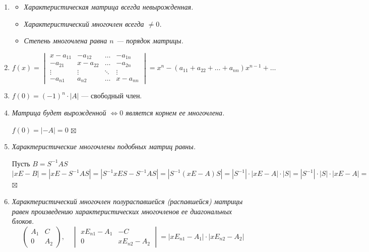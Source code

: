 \documentclass[a4paper, 12pt]{article}
\newenvironment{Proof}
{\par\noindent{$\blacklozenge$}}
{\hfill$\scriptstyle\boxtimes$}
\begin{document}
    \begin{enumerate}
        \item \begin{itemize}
            \item \textit{Характеристическая матрица всегда невырожденная.}
            \item \textit{Характеристический многочлен всегда $\neq 0$.}
            \item \textit{Степень многочлена равна $n$ --- порядок матрицы.}
        \end{itemize}
        \item $f(x) = 
        \begin{vmatrix}
        x-a_{11} & -a_{12} & \dots & -a_{1n}\\
        -a_{21} & x-a_{22} & \dots & -a_{2n}\\
        \vdots & \vdots & \ddots & \vdots\\
        -a_{n1} & a_{n2} & \dots & x-a_{nn}
        \end{vmatrix}
        = x^n - (a_{11} + a_{22} + \dots + a_{nn})x^{n-1} + \dots$
        \item $f(0) = (-1)^n \cdot |A|$ --- свободный член.
        \item \textit{Матрица будет вырожденной $\Leftrightarrow 0 $ является корнем ее многочлена.}
        \begin{Proof}
        $f(0) = |-A| = 0$
        \end{Proof}
        \item \textit{Характеристические многочлены подобных матриц равны.}
        \begin{Proof}
        Пусть $B = S^{-1}AS$\\
        $|xE-B| = |xE - S^{-1}AS| = |S^{-1}xES - S^{-1}AS| = |S^{-1}(xE-A)S| = |S^{-1}| \cdot |xE-A| \cdot |S| = |S^{-1}| \cdot |S| \cdot |xE-A| = |S \cdot S^{-1}| \cdot |xE - A| = |E| \cdot |xE - A| = |xE - A|$
        \end{Proof}
        \item \textit{Характеристический многочлен полураспавшейся (распавшейся) матрицы равен произведению характеристических многочленов ее диагональных блоков.}
        $$\begin{pmatrix}
        A_1 & C\\
        0 & A_2
        \end{pmatrix}, \quad 
        \begin{vmatrix}
        xE_{n1}-A_1 & -C\\
        0 & xE_{n2}-A_2
        \end{vmatrix} = |xE_{n1}-A_1|\cdot|xE_{n2}-A_2|$$
    \end{enumerate}
\end{document}

